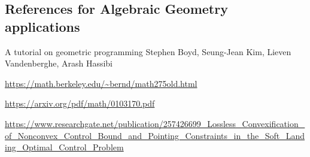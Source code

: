 \documentclass[10pt]{amsart}
\begin{document}
\begin{multicols*}{2}
\section{References for Algebraic Geometry applications}

 A tutorial on geometric programming
	Stephen Boyd, Seung-Jean Kim, Lieven Vandenberghe, Arash Hassibi

\url{https://math.berkeley.edu/~bernd/math275old.html}

\url{https://arxiv.org/pdf/math/0103170.pdf}

\url{https://www.researchgate.net/publication/257426699_Lossless_Convexification_of_Nonconvex_Control_Bound_and_Pointing_Constraints_in_the_Soft_Landing_Optimal_Control_Problem}

\end{multicols*}
\end{document}
